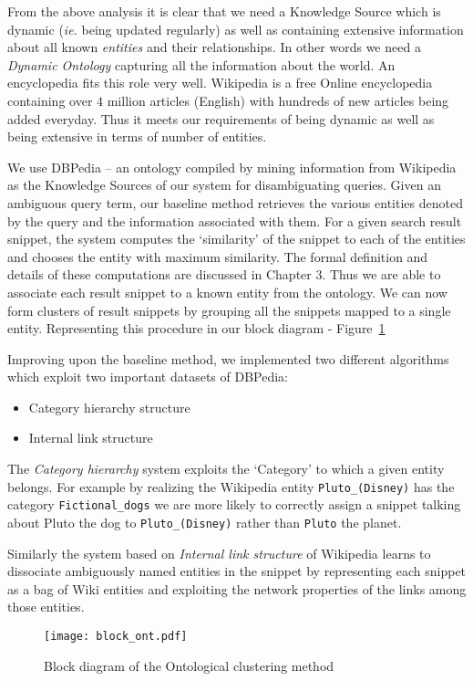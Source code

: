 \documentclass[a4paper,12pt]{report}
\begin{document}
From the above analysis it is clear that we need a Knowledge
Source which is dynamic ({\it ie.} being updated regularly) as well as
containing extensive information about all known {\it entities} and
their relationships. In other words we need a {\it Dynamic Ontology}
capturing all the information about the world. An encyclopedia fits
this role very well. Wikipedia is a free Online encyclopedia
containing over $4$ million articles (English) with hundreds of new
articles being added everyday. Thus it meets our requirements of being
dynamic as well as being extensive in terms of number of entities. 

We use DBPedia -- an ontology compiled by mining information from
Wikipedia as the Knowledge Sources of our system for disambiguating
queries. Given an ambiguous query term, our baseline method retrieves
the various entities denoted by the query and the information
associated with them. For a given search result snippet, the system
computes the `similarity' of the snippet to each of the entities and
chooses the entity with maximum similarity. The formal definition and
details of these computations are discussed in Chapter 3. Thus we are
able to associate each result snippet to a known entity from the
ontology. We can now form clusters of result snippets by grouping all
the snippets mapped to a single entity. Representing this procedure in
our block diagram - Figure~\ref{fig:OntClust}

Improving upon the baseline method, we implemented two different
algorithms which exploit two important datasets of DBPedia:
\begin{itemize}
  \item Category hierarchy structure
  \item Internal link structure
\end{itemize}

The {\it Category hierarchy} system exploits the `Category' to which a
given entity belongs. For example by realizing the Wikipedia entity
\verb|Pluto_(Disney)| has the category \verb|Fictional_dogs| we are more
likely to correctly assign a snippet talking about Pluto the dog to
\verb|Pluto_(Disney)| rather than \verb|Pluto| the planet.

Similarly the system based on {\it Internal link structure} of
Wikipedia learns to dissociate ambiguously named entities in the
snippet by representing each snippet as a bag of Wiki entities and
exploiting the network properties of the links among those entities.

\begin{figure}[h]
  \centering
  \texttt{[image: block\_ont.pdf]}
  \caption{Block diagram of the Ontological clustering method}
  \label{fig:OntClust}
\end{figure}
\end{document}
